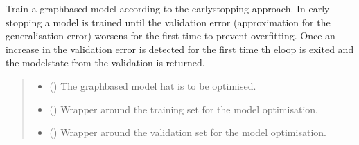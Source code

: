 \documentclass[a4paper,10pt,english]{report}
\begin{document}
\begin{fulllineitems}
\label{\detokenize{NNucleate:NNucleate.training.early_stopping_gnn}}
\pysigstartsignatures
{}
\pysigstopsignatures
\sphinxAtStartPar
Train a graph\sphinxhyphen{}based model according to the early\sphinxhyphen{}stopping approach.
In early stopping a model is trained until the validation error (approximation for the generalisation error) worsens for the first time to prevent overfitting.
Once an increase in the validation error is detected for the first time th eloop is exited and the model\sphinxhyphen{}state from the  validation is returned.
\begin{quote}\begin{description}
\begin{itemize}
\item {} 
\sphinxAtStartPar
{} ({\hyperref[\detokenize{NNucleate:NNucleate.models.GNNCV}]{}}) \textendash{} The graph\sphinxhyphen{}based model hat is to be optimised.

\item {} 
\sphinxAtStartPar
{} () \textendash{} Wrapper around the training set for the model optimisation.

\item {} 
\sphinxAtStartPar
{} () \textendash{} Wrapper around the validation set for the model optimisation.


\end{itemize}
\end{description}
\end{quote}
\end{fulllineitems}
\end{document}

